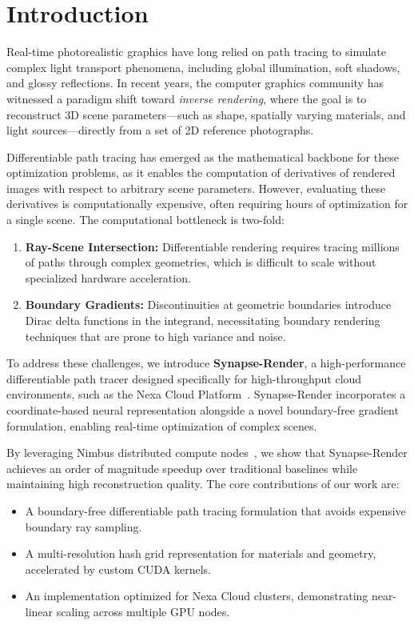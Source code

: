 \section{Introduction}
Real-time photorealistic graphics have long relied on path tracing to simulate complex light transport phenomena, including global illumination, soft shadows, and glossy reflections. In recent years, the computer graphics community has witnessed a paradigm shift toward \emph{inverse rendering}, where the goal is to reconstruct 3D scene parameters—such as shape, spatially varying materials, and light sources—directly from a set of 2D reference photographs. 

Differentiable path tracing has emerged as the mathematical backbone for these optimization problems, as it enables the computation of derivatives of rendered images with respect to arbitrary scene parameters. However, evaluating these derivatives is computationally expensive, often requiring hours of optimization for a single scene. The computational bottleneck is two-fold:
\begin{enumerate}
    \item \textbf{Ray-Scene Intersection:} Differentiable rendering requires tracing millions of paths through complex geometries, which is difficult to scale without specialized hardware acceleration.
    \item \textbf{Boundary Gradients:} Discontinuities at geometric boundaries introduce Dirac delta functions in the integrand, necessitating boundary rendering techniques that are prone to high variance and noise.
\end{enumerate}

To address these challenges, we introduce \textbf{Synapse-Render}, a high-performance differentiable path tracer designed specifically for high-throughput cloud environments, such as the Nexa Cloud Platform~\cite{rostova2025synapse}. Synapse-Render incorporates a coordinate-based neural representation alongside a novel boundary-free gradient formulation, enabling real-time optimization of complex scenes. 

By leveraging Nimbus distributed compute nodes~\cite{nimbus2025cloud}, we show that Synapse-Render achieves an order of magnitude speedup over traditional baselines while maintaining high reconstruction quality. The core contributions of our work are:
\begin{itemize}
    \item A boundary-free differentiable path tracing formulation that avoids expensive boundary ray sampling.
    \item A multi-resolution hash grid representation for materials and geometry, accelerated by custom CUDA kernels.
    \item An implementation optimized for Nexa Cloud clusters, demonstrating near-linear scaling across multiple GPU nodes.
\end{itemize}
